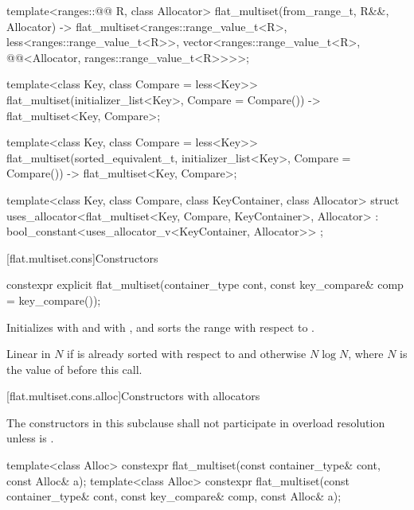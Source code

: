 \begin{codeblock}
{  template<ranges::@@ R, class Allocator>
    flat_multiset(from_range_t, R&&, Allocator)
      -> flat_multiset<ranges::range_value_t<R>, less<ranges::range_value_t<R>>,
                       vector<ranges::range_value_t<R>,
                              @@<Allocator, ranges::range_value_t<R>>>>;

  template<class Key, class Compare = less<Key>>
    flat_multiset(initializer_list<Key>, Compare = Compare())
      -> flat_multiset<Key, Compare>;

  template<class Key, class Compare = less<Key>>
    flat_multiset(sorted_equivalent_t, initializer_list<Key>, Compare = Compare())
      -> flat_multiset<Key, Compare>;

  template<class Key, class Compare, class KeyContainer, class Allocator>
    struct uses_allocator<flat_multiset<Key, Compare, KeyContainer>, Allocator>
      : bool_constant<uses_allocator_v<KeyContainer, Allocator>> { };
}
\end{codeblock}

[flat.multiset.cons]{Constructors}

%
\begin{itemdecl}
constexpr explicit flat_multiset(container_type cont, const key_compare& comp = key_compare());
\end{itemdecl}

\begin{itemdescr}
\pnum
\effects
Initializes  with  and
 with , and
sorts the range  with respect to .

\pnum
\complexity
Linear in $N$ if  is already sorted with respect to  and
otherwise $N \log N$, where $N$ is the value of  before this call.
\end{itemdescr}

[flat.multiset.cons.alloc]{Constructors with allocators}

\pnum
The constructors in this subclause shall not participate in overload resolution
unless  is .

%
\begin{itemdecl}
template<class Alloc>
  constexpr flat_multiset(const container_type& cont, const Alloc& a);
template<class Alloc>
  constexpr flat_multiset(const container_type& cont, const key_compare& comp, const Alloc& a);
\end{itemdecl}

